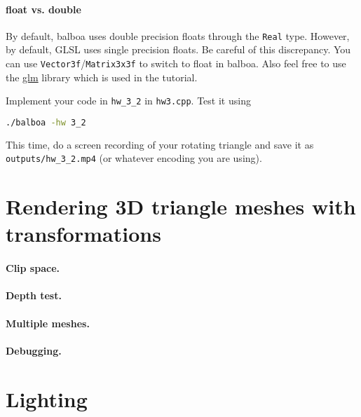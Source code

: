 \paragraph{float vs. double} By default, balboa uses double precision floats through the \lstinline{Real} type. However, by default, GLSL uses single precision floats. Be careful of this discrepancy. You can use \lstinline{Vector3f}/\lstinline{Matrix3x3f} to switch to float in balboa. Also feel free to use the \href{https://github.com/g-truc/glm}{glm} library which is used in the tutorial.

Implement your code in \lstinline{hw_3_2} in \lstinline{hw3.cpp}. Test it using
\begin{lstlisting}[language=bash]
./balboa -hw 3_2
\end{lstlisting}

This time, do a screen recording of your rotating triangle and save it as \lstinline{outputs/hw_3_2.mp4} (or whatever encoding you are using).

\section{Rendering 3D triangle meshes with transformations}

\paragraph{Clip space.}

\paragraph{Depth test.}

\paragraph{Multiple meshes.}

\paragraph{Debugging.} 

\section{Lighting}

%
%


